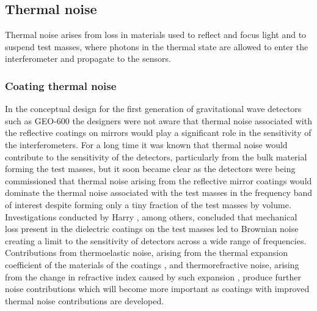

\subsection{Thermal noise}

Thermal noise arises from loss in materials used to reflect and focus light and to suspend test masses, where photons in the thermal state are allowed to enter the interferometer and propagate to the sensors.

\subsubsection{\label{sec:coating-thermal-noise}Coating thermal noise}
In the conceptual design for the first generation of gravitational wave detectors such as GEO-600 \cite{Willke2002} the designers were not aware that thermal noise associated with the reflective coatings on mirrors would play a significant role in the sensitivity of the interferometers. For a long time it was known that thermal noise would contribute to the sensitivity of the detectors, particularly from the bulk material forming the test masses, but it soon became clear as the detectors were being commissioned that thermal noise arising from the reflective mirror coatings would dominate the thermal noise associated with the test masses in the frequency band of interest despite forming only a tiny fraction of the test masses by volume. Investigations conducted by Harry \etal{} \cite{Harry2002, Harry2007}, among others, concluded that mechanical loss present in the dielectric coatings on the test masses led to Brownian noise creating a limit to the sensitivity of detectors across a wide range of frequencies. Contributions from thermoelastic noise, arising from the thermal expansion coefficient of the materials of the coatings \cite{Braginsky1999a}, and thermorefractive noise, arising from the change in refractive index caused by such expansion \cite{Braginsky2000a}, produce further noise contributions which will become more important as coatings with improved thermal noise contributions are developed.

